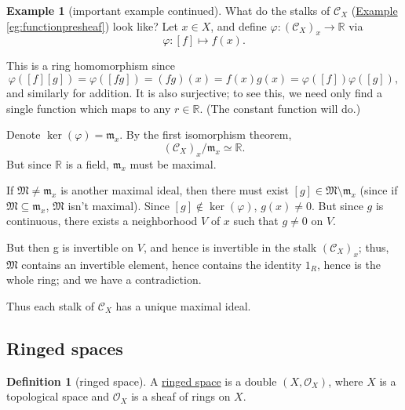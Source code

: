 \documentclass[a4paper,10pt]{scrreprt}
\newcommand{\R}{\mathbb{R}}
\newcommand{\defn}[1]{\ul{#1}}
\theoremstyle{definition}
\newtheorem{definition}{Definition}[section]
\newtheorem{example}{Example}[section]
\theoremstyle{plain}
\theoremstyle{remark}
\begin{document}
\begin{example}[important example continued]
  \label{eg:stalksofcx}
  What do the stalks of $\mathcal{C}_{X}$ (\hyperref[eg:functionpresheaf]{Example \ref*{eg:functionpresheaf}}) look like? Let $x \in X$, and define $\varphi\colon (\mathcal{C}_{X})_{x} \to \R$ via
  \begin{equation*}
    \varphi\colon [f] \mapsto f(x).
  \end{equation*}

  This is a ring homomorphism since
  \begin{equation*}
    \varphi([f][g]) = \varphi([fg]) = (fg)(x) = f(x)g(x) = \varphi([f])\varphi([g]),
  \end{equation*}
  and similarly for addition. It is also surjective; to see this, we need only find a single function which maps to any $r \in \R$. (The constant function will do.)

  Denote $\ker(\varphi) = \mathfrak{m}_{x}$. By the first isomorphism theorem,
  \begin{equation*}
    (\mathcal{C}_{X})_{x} / \mathfrak{m}_{x} \simeq \R.
  \end{equation*}
  But since $\R$ is a field, $\mathfrak{m}_{x}$ must be maximal. 

  If $\mathfrak{M} \neq \mathfrak{m}_{x}$ is another maximal ideal, then there must exist $[g] \in \mathfrak{M} \setminus \mathfrak{m}_{x}$ (since if $\mathfrak{M} \subseteq \mathfrak{m}_{x}$, $\mathfrak{M}$ isn't maximal). Since $[g] \notin \ker(\varphi)$, $g(x) \neq 0$. But since $g$ is continuous, there exists a neighborhood $V$ of $x$ such that $g \neq 0$ on $V$. 

  But then g is invertible on $V$, and hence is invertible in the stalk $(\mathcal{C}_{X})_{x}$; thus, $\mathfrak{M}$ contains an invertible element, hence contains the identity $1_{R}$, hence is the whole ring; and we have a contradiction.

  Thus each stalk of $\mathcal{C}_{X}$ has a unique maximal ideal.
\end{example}

\subsection{Ringed spaces}
\begin{definition}[ringed space] 
  \label{def:ringedspace} A \defn{ringed space} is a double $(X, \mathcal{O}_{X})$, where $X$ is a topological space and $\mathcal{O}_{X}$ is a sheaf of rings on $X$.
\end{definition}
\end{document}
